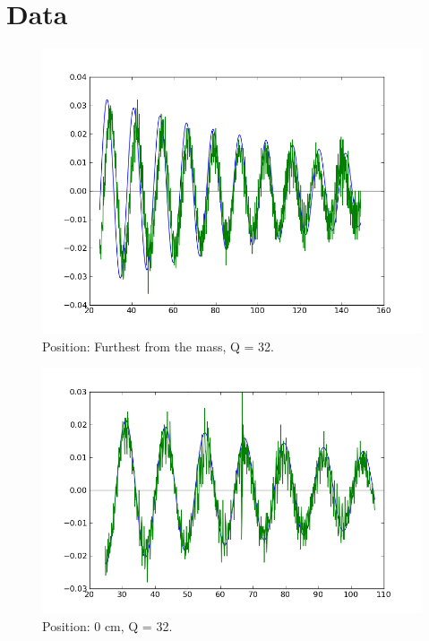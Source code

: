 \documentclass[12pt]{article}
\begin{document}
\section{Data}
\begin{figure}[H]
\centering
\hspace{-0.0in}\includegraphics[scale=0.60]{SeisPosition1.png}
\caption{Position: Furthest from the mass, Q = 32. \label{fig:setup}}
\end{figure}

\begin{figure}[H]
\centering
\hspace{-0.0in}\includegraphics[scale=0.60]{SeisPosition2.png}
\caption{Position: 0 cm, Q = 32. \label{fig:setup}}
\end{figure}
\end{document}
